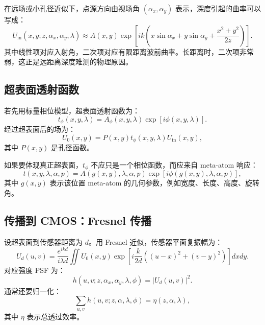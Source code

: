 \documentclass[11pt,a4paper,fontset=none]{ctexart}
\begin{document}
在远场或小孔径近似下，点源方向由视场角 $(\alpha_x,\alpha_y)$ 表示，深度引起的曲率可以写成：
\begin{equation}
  U_{\mathrm{in}}(x,y;z,\alpha_x,\alpha_y,\lambda)
  \approx
  A(x,y)
  \exp\left[
  ik
  \left(
  x\sin\alpha_x
  +y\sin\alpha_y
  +\frac{x^2+y^2}{2z}
  \right)
  \right].
  \label{eq:incident_wave}
\end{equation}
其中线性项对应入射角，二次项对应有限距离波前曲率。长距离时，二次项非常弱，这正是远距离深度难测的物理原因。

\subsection{超表面透射函数}

若先用标量相位模型，超表面透射函数为：
\begin{equation}
  t_\phi(x,y,\lambda)
  =
  A_\phi(x,y,\lambda)
  \exp\left[i\phi(x,y,\lambda)\right].
\end{equation}
经过超表面后的场为：
\begin{equation}
  U_0(x,y)
  =
  P(x,y)
  t_\phi(x,y,\lambda)
  U_{\mathrm{in}}(x,y),
  \label{eq:after_meta}
\end{equation}
其中 $P(x,y)$ 是孔径函数。

如果要体现真正超表面，$t_\phi$ 不应只是一个相位函数，而应来自 meta-atom 响应：
\begin{equation}
  t(x,y,\lambda,\alpha,p)
  =
  A(g(x,y),\lambda,\alpha,p)
  \exp[i\phi(g(x,y),\lambda,\alpha,p)],
\end{equation}
其中 $g(x,y)$ 表示该位置 meta-atom 的几何参数，例如宽度、长度、高度、旋转角。

\subsection{传播到 CMOS：Fresnel 传播}

设超表面到传感器距离为 $d$。用 Fresnel 近似，传感器平面复振幅为：
\begin{equation}
  U_d(u,v)
  =
  \frac{e^{ikd}}{i\lambda d}
  \iint
  U_0(x,y)
  \exp\left[
  i\frac{k}{2d}
  \left((u-x)^2+(v-y)^2\right)
  \right]
  dxdy.
  \label{eq:fresnel}
\end{equation}
对应强度 PSF 为：
\begin{equation}
  h(u,v;z,\alpha_x,\alpha_y,\lambda,\phi)
  =
  |U_d(u,v)|^2.
\end{equation}
通常还要归一化：
\begin{equation}
  \sum_{u,v}h(u,v;z,\alpha,\lambda,\phi)=\eta(z,\alpha,\lambda),
\end{equation}
其中 $\eta$ 表示总透过效率。
\end{document}
